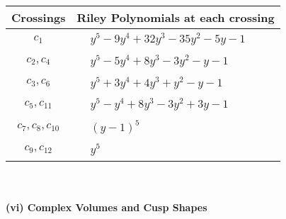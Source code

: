 \documentclass[1p]{elsarticle_modified}
\theoremstyle{definition}
\begin{document}
\begin{tabular}{m{50pt}|m{274pt}}
Crossings & \hspace{64pt}Riley Polynomials at each crossing \\
\hline $$\begin{aligned}c_{1}\end{aligned}$$&$\begin{aligned}
&y^5-9 y^4+32 y^3-35 y^2-5 y-1
\end{aligned}$\\
\hline $$\begin{aligned}c_{2},c_{4}\end{aligned}$$&$\begin{aligned}
&y^5-5 y^4+8 y^3-3 y^2- y-1
\end{aligned}$\\
\hline $$\begin{aligned}c_{3},c_{6}\end{aligned}$$&$\begin{aligned}
&y^5+3 y^4+4 y^3+y^2- y-1
\end{aligned}$\\
\hline $$\begin{aligned}c_{5},c_{11}\end{aligned}$$&$\begin{aligned}
&y^5- y^4+8 y^3-3 y^2+3 y-1
\end{aligned}$\\
\hline $$\begin{aligned}c_{7},c_{8},c_{10}\end{aligned}$$&$\begin{aligned}
&(y-1)^5
\end{aligned}$\\
\hline $$\begin{aligned}c_{9},c_{12}\end{aligned}$$&$\begin{aligned}
&y^5
\end{aligned}$\\
\hline
\end{tabular}\\~\\
\newpage\flushleft \textbf{(vi) Complex Volumes and Cusp Shapes}
\end{document}
